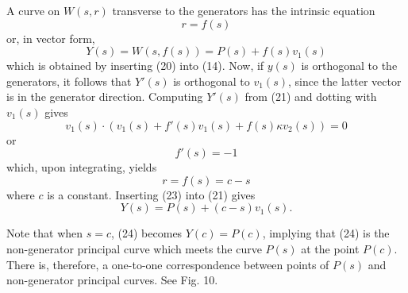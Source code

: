 \documentclass{book}
\begin{document}
A curve on $W(s,r)$ transverse to the generators has the intrinsic equation
\begin{equation}
r = f(s)
\end{equation}
or, in vector form,
\begin{equation}
Y(s) = W(s,f(s)) = P(s) + f(s) v_{1}(s)
\end{equation}
which is obtained by inserting (20) into (14). Now, if $y(s)$ is orthogonal to the generators, it follows that $Y'(s)$ is orthogonal to $v_{1}(s)$, since the latter vector is in the generator direction. Computing $Y'(s)$ from (21) and dotting with $v_{1}(s)$ gives
\begin{equation*}
v_{1}(s) \cdot (v_{1}(s) + f'(s) v_{1}(s) + f(s) \kappa v_{2}(s)) = 0
\end{equation*}
or
\begin{equation}
f'(s) = - 1
\end{equation}
which, upon integrating, yields
\begin{equation}
r = f(s) = c - s
\end{equation}
where $c$ is a constant. Inserting (23) into (21) gives
\begin{equation}
Y(s) = P(s) + (c - s) v_{1}(s).
\end{equation}

Note that when $s = c$, (24) becomes $Y(c) = P(c)$, implying that (24) is the non-generator principal curve which meets the curve $P(s)$ at the point $P(c)$. There is, therefore, a one-to-one correspondence between points of $P(s)$ and non-generator principal curves. See Fig. 10.
\end{document}
